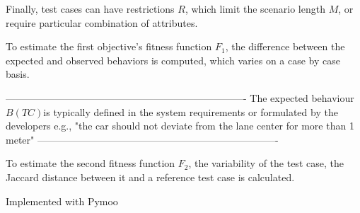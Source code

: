 Finally, test cases can have restrictions $ R $, which limit the scenario length $ M $, or require particular combination of attributes.

To estimate the first objective's fitness function $ F_1 $, the difference between the expected and observed behaviors is computed, which varies on a case by case basis.

-------------------------------------------------------------------------\newline
The expected behaviour $ B(TC) $is typically defined in the system
requirements or formulated by the developers e.g., "the car
should not deviate from the lane center for more than 1
meter"
-------------------------------------------------------------------------\newline

To estimate the second fitness function $ F_2 $, the variability of the test case, the Jaccard distance between it and a reference test case is calculated.

Implemented with Pymoo